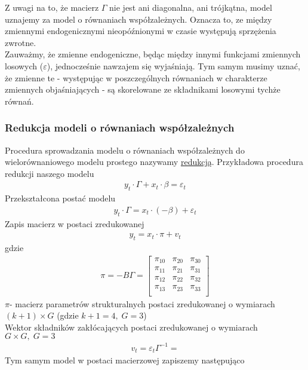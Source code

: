 Z uwagi na to, że macierz $ \Gamma $ nie jest ani diagonalna, ani trójkątna, model uznajemy za model o równaniach współzależnych. Oznacza to, ze między zmiennymi endogenicznymi nieopóźnionymi w czasie występują sprzężenia zwrotne.\\
Zauważmy, że zmienne endogeniczne, będąc między innymi funkcjami zmiennych losowych ($ \varepsilon $), jednocześnie nawzajem się wyjaśniają. Tym samym musimy uznać, że zmienne te - występując w poszczególnych równaniach w charakterze zmiennych objaśniających - są skorelowane ze składnikami losowymi tychże równań.

\subsubsection{Redukcja modeli o równaniach współzależnych}
Procedura sprowadzania modelu o równaniach współzależnych do wielorównaniowego modelu prostego nazywamy \underline{redukcją}. Przykładowa procedura redukcji naszego modelu
\begin{gather*}
y_t\cdot\Gamma+x_t\cdot \beta=\varepsilon_t
\end{gather*}
Przekształcona postać modelu
\begin{gather*}
y_t\cdot\Gamma=x_t\cdot (-\beta)+\varepsilon_t
\end{gather*}
Zapis macierz w postaci zredukowanej
\begin{gather*}
y_t=x_t\cdot \pi+v_t
\end{gather*}
gdzie \begin{gather*}
\pi=-B\Gamma=
\begin{bmatrix}
\pi _{10} & \pi _{20} & \pi _{30} \\
\pi _{11} & \pi _{21} & \pi _{31} \\
\pi _{12} & \pi _{22} & \pi _{32} \\
\pi _{13} & \pi _{23} & \pi _{33} \\
\end{bmatrix}
\end{gather*}
$ \pi  $- macierz parametrów strukturalnych postaci zredukowanej o wymiarach $(k+1)\times G $ (gdzie $ k+1=4,\;G=3 $)\\
Wektor składników zakłócających postaci zredukowanej o wymiarach $ G\times G,\;G=3 $
\begin{gather*}
v_t=\varepsilon_t\Gamma^{-1}=
\end{gather*}
Tym samym model w postaci macierzowej zapiszemy następująco
